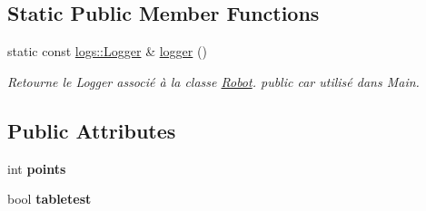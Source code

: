 \subsection*{Static Public Member Functions}
\begin{DoxyCompactItemize}
\item 
\mbox{\label{classRobot_ace39678c476c8e8b193d9c8baf7a692b}} 
static const \hyperlink{classlogs_1_1Logger}{logs\+::\+Logger} \& \hyperlink{classRobot_ace39678c476c8e8b193d9c8baf7a692b}{logger} ()
\begin{DoxyCompactList}\small\item\em Retourne le Logger associé à la classe \hyperlink{classRobot}{Robot}. public car utilisé dans Main. \end{DoxyCompactList}\end{DoxyCompactItemize}
\subsection*{Public Attributes}
\begin{DoxyCompactItemize}
\item 
\mbox{\label{classRobot_a60721ce181332a194a48d6ff2acc43fb}} 
int {\bfseries points}
\item 
\mbox{\label{classRobot_a4cdf8f811024eabbe97fda9e6e8140a4}} 
bool {\bfseries tabletest}
\end{DoxyCompactItemize}
